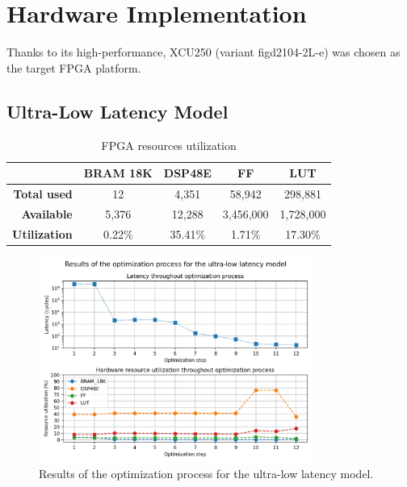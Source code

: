 \section{Hardware Implementation}
Thanks to its high-performance, XCU250 (variant figd2104-2L-e) was chosen as the target FPGA platform.

\subsection{Ultra-Low Latency Model}
\indo{|}
\indo{|}
\indo{|}
\indo{|}

\indo{|}
\indo{|}

\begin{table}[hpt!]
  \centering
  \caption{FPGA resources utilization}
  \label{tab:utilization}
  \bgroup
  \def\arraystretch{1.3}
  \setlength\tabcolsep{3mm}
  \begin{tabular}{r|c|c|c|c|}
  \cline{2-5}
  \multicolumn{1}{c|}{}                      & \textbf{BRAM 18K} & \textbf{DSP48E} & \textbf{FF} & \textbf{LUT} \\ \hline
  \multicolumn{1}{|r|}{\textbf{Total used}}       & 12                 & 4,351            & 58,942       & 298,881       \\ \hline
  \multicolumn{1}{|r|}{\textbf{Available}}   & 5,376              & 12,288           & 3,456,000     & 1,728,000      \\ \hline\hline
  \multicolumn{1}{|r|}{\textbf{Utilization}} & 0.22\%            & 35.41\%         & 1.71\%      & 17.30\%       \\ \hline
  \end{tabular}
  \egroup
\end{table}

\indo{|}
\indo{|}
\indo{|}

\begin{figure}[hpt!]
  \centering
  \includegraphics[trim={0cm 0cm 0cm 1cm}, clip, width=0.8\textwidth, center]{../logs/hardware_optimizations.png}
  \caption{Results of the optimization process for the ultra-low latency model.}
  \label{fig:hardware-optimizations}
\end{figure}

